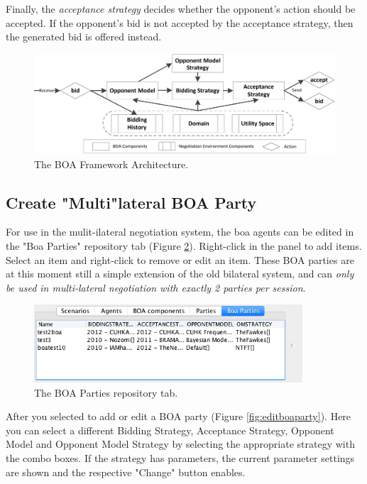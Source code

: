 \documentclass[]{article}
\begin{document}
Finally, the \textit{acceptance strategy} decides whether the opponent's action should be accepted. If the opponent's bid is not accepted by the acceptance strategy, then the generated bid is offered instead.

\begin{figure}[t] 
	\center
	\includegraphics[width=15.0cm]{media/BOAflow.png}
	\caption{The BOA Framework Architecture.}
	\label{fig:flowchart}
\end{figure}


\subsection{Create "Multi"lateral BOA Party}
For use in the mulit-ilateral negotiation system, the boa agents can be edited in the "Boa Parties" repository tab (Figure \ref{fig:boaparties}). Right-click in the panel to add items. Select an item and right-click to remove or edit an item.  These BOA parties are at this moment still a simple extension of the old bilateral system, and can \emph{only be used in multi-lateral negotiation with exactly 2 parties per session}.  


\begin{figure}[!ht] 
	\center
	\includegraphics[width=10.0cm]{media/boacomponants.png}
	\caption{The BOA Parties repository tab.}
	\label{fig:boaparties}
\end{figure}


After you selected to add or edit a BOA party (Figure \ref{fig:editboaparty}).  Here you can select a different Bidding Strategy, Acceptance Strategy, Opponent Model and Opponent Model Strategy by selecting the appropriate strategy with the combo boxes. If the strategy has parameters, the current parameter settings are shown and the respective "Change" button enables.
\end{document}
